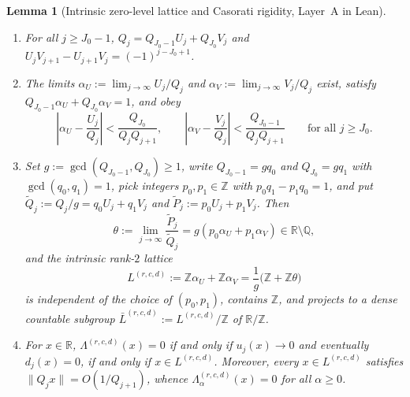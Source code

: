 \documentclass[11pt]{article}
\newtheorem{lemma}[theorem]{Lemma}
\theoremstyle{definition}
\theoremstyle{remark}
\newcommand{\R}{\mathbb{R}}
\newcommand{\Z}{\mathbb{Z}}
\newcommand{\Q}{\mathbb{Q}}
\newcommand{\Lam}{\Lambda}
\begin{document}
\begin{lemma}[Intrinsic zero-level lattice and Casorati rigidity, Layer~A in Lean]\label{lem:poly-lattice}
\begin{enumerate}[label=(\roman*),leftmargin=2em]
\item For all $j\ge J_0-1$, $Q_j=Q_{J_0-1}U_j+Q_{J_0}V_j$ and
$U_jV_{j+1}-U_{j+1}V_j=(-1)^{j-J_0+1}$.
\item The limits $\alpha_U:=\lim_{j\to\infty}U_j/Q_j$ and
$\alpha_V:=\lim_{j\to\infty}V_j/Q_j$ exist, satisfy
$Q_{J_0-1}\alpha_U+Q_{J_0}\alpha_V=1$, and obey
\[
\left|\alpha_U-\frac{U_j}{Q_j}\right|<\frac{Q_{J_0}}{Q_jQ_{j+1}},\qquad
\left|\alpha_V-\frac{V_j}{Q_j}\right|<\frac{Q_{J_0-1}}{Q_jQ_{j+1}}
\qquad\text{for all }j\ge J_0.
\]
\item Set $g:=\gcd(Q_{J_0-1},Q_{J_0})\ge1$, write $Q_{J_0-1}=gq_0$ and
$Q_{J_0}=gq_1$ with $\gcd(q_0,q_1)=1$, pick integers $p_0,p_1\in\Z$ with
$p_0q_1-p_1q_0=1$, and put $\tilde Q_j:=Q_j/g=q_0U_j+q_1V_j$ and
$\tilde P_j:=p_0U_j+p_1V_j$. Then
\[
\theta:=\lim_{j\to\infty}\frac{\tilde P_j}{\tilde Q_j}=g(p_0\alpha_U+p_1\alpha_V)\in\R\setminus\Q,
\]
and the intrinsic rank-$2$ lattice
\[
L^{(r,c,d)}:=\Z\alpha_U+\Z\alpha_V=\frac{1}{g}\bigl(\Z+\Z\theta\bigr)
\]
is independent of the choice of $(p_0,p_1)$, contains $\Z$, and projects to a
dense countable subgroup $\bar L^{(r,c,d)}:=L^{(r,c,d)}/\Z$ of $\R/\Z$.
\item For $x\in\R$, $\Lam^{(r,c,d)}(x)=0$ if and only if $u_j(x)\to0$ and
eventually $d_j(x)=0$, if and only if $x\in L^{(r,c,d)}$. Moreover, every
$x\in L^{(r,c,d)}$ satisfies $\|Q_jx\|=O(1/Q_{j+1})$, whence
$\Lam_\alpha^{(r,c,d)}(x)=0$ for all $\alpha\ge0$.
\end{enumerate}
\end{lemma}
\end{document}
